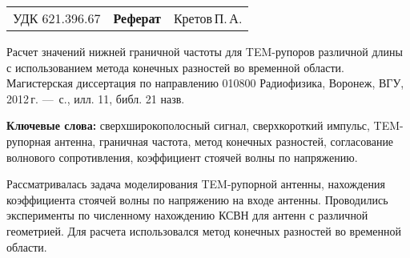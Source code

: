 
\noindent
{
\begin{tabularx}{\textwidth}{lCr}
УДК 621.396.67 & \textbf{Реферат} & Кретов\,П.\,А.
\end{tabularx}}
\vspace{10mm}

Расчет значений нижней граничной частоты для TEM-рупоров различной длины
с использованием метода конечных разностей во временной области.\\
Магистерская диссертация по направлению 010800 Радиофизика, Воронеж, ВГУ, 2012\,г.
--- \lastpage\,с., илл. 11, библ. 21 назв.

\vspace{10mm}

\noindent
\textbf{Ключевые слова:} сверхширокополосный сигнал, сверхкороткий импульс, TEM-рупорная антенна, граничная частота, метод конечных разностей, согласование волнового сопротивления, коэффициент стоячей волны по напряжению.

\vspace{10mm}
Рассматривалась задача моделирования TEM-рупорной антенны, нахождения коэффициента стоячей волны по напряжению на входе антенны. Проводились эксперименты по численному нахождению КСВН для антенн с различной геометрией. Для расчета использовался метод конечных разностей во временной области.
\newpage

